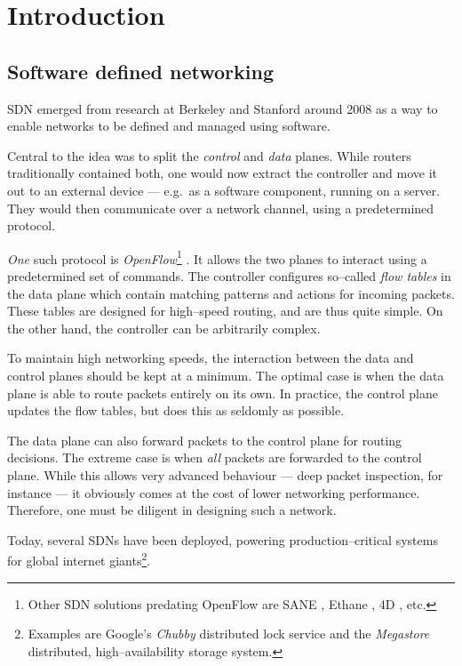 \chapter{Introduction}

\section{Software defined networking}

\acf{SDN} \cite{Casado:2005:VNS:1047344.1047383} emerged from research at
Berkeley and Stanford around 2008 as a way to enable networks to be defined
and managed using software.

Central to the idea was to split the {\em control} and {\em data} planes.
While routers traditionally contained both, one would now extract the
controller and move it out to an external device --- e.g.~as a software
component, running on a server.  They would then communicate over a network
channel, using a predetermined protocol.

{\em One} such protocol is {\em OpenFlow}\footnote{Other
\ac{SDN} solutions predating OpenFlow are SANE
\cite{Casado:2006:SPA:1267336.1267346}, Ethane
\cite{Casado:2007:ETC:1282427.1282382}, 4D
\cite{Greenberg:2005:CSA:1096536.1096541}, etc.}
\cite{McKeown:2008:OEI:1355734.1355746}.  It allows the two planes to
interact using a predetermined set of commands.  The controller configures
so--called {\em flow tables} in the data plane  which contain matching patterns and actions for incoming packets.
These tables are designed for high--speed routing, and are thus quite
simple.  On the other hand, the controller can be arbitrarily complex.

To maintain high networking speeds, the interaction between the data and
control planes should be kept at a minimum.  The optimal case is when the
data plane is able to route packets entirely on its own.  In practice, the
control plane updates the flow tables, but does this as seldomly as
possible.

The data plane can also forward packets to the control plane for routing decisions. The extreme case is when {\em all} packets are
forwarded to the control plane.  While this allows very advanced behaviour
--- deep packet inspection, for instance --- it obviously comes at the cost
of lower networking performance.  Therefore, one must be diligent in
designing such a network.

Today, several \acp{SDN} have been deployed, powering production--critical
systems for global internet giants\footnote{Examples are
Google's {\em Chubby} distributed lock
service and the {\em Megastore}
distributed, high--availability storage system.}.

